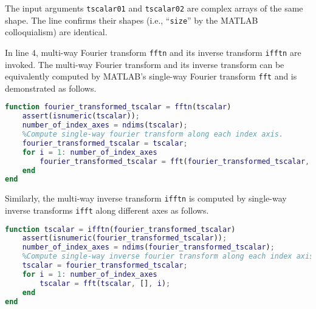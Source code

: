 \documentclass[12pt,reqno]{amsart}
\numberwithin{equation}{section}
\numberwithin{figure}{section}
\numberwithin{table}{section}
\theoremstyle{definition}
\begin{document}
The input arguments {\tt tscalar01} and {\tt tscalar02} are complex arrays of the same shape.  
The line confirms their shapes (i.e., ``{\tt size}'' by the MATLAB colloquialism) are identical. 

In line $4$, multi-way Fourier transform {\tt fftn} and its inverse transform {\tt ifftn} are invoked. The multi-way Fourier transform and its inverse transform can be equivalently computed by MATLAB's single-way Fourier transform {\tt fft} and is demonstrated as follows. 

\begin{lstlisting}[language=MATLAB, caption={Demo: multi-way Fourier transform {\tt fftn} implemented by single-way Fourier transforms {\tt fft} }] 
function fourier_transformed_tscalar = fftn(tscalar)
	assert(isnumeric(tscalar));
	number_of_index_axes = ndims(tscalar); 		
	%Compute single-way fourier transform along each index axis. 
	fourier_transformed_tscalar = tscalar;
	for i = 1: number_of_index_axes
		fourier_transformed_tscalar = fft(fourier_transformed_tscalar, [], i);
	end
end
\end{lstlisting} 


Similarly, the multi-way inverse transform {\tt ifftn} is computed by single-way inverse transforms {\tt ifft} along different axes as follows.  


\begin{lstlisting}[language=MATLAB, caption={Demo: multi-way inverse Fourier transform {\tt ifftn} implemented by single-way Fourier transforms {\tt ifft} }]
function tscalar = ifftn(fourier_transformed_tscalar)
	assert(isnumeric(fourier_transformed_tscalar));
	number_of_index_axes = ndims(fourier_transformed_tscalar); 		
	%Compute single-way inverse fourier transform along each index axis. 
	tscalar = fourier_transformed_tscalar;
	for i = 1: number_of_index_axes
		tscalar = fft(tscalar, [], i);
	end	
end
\end{lstlisting} 





\end{document}
